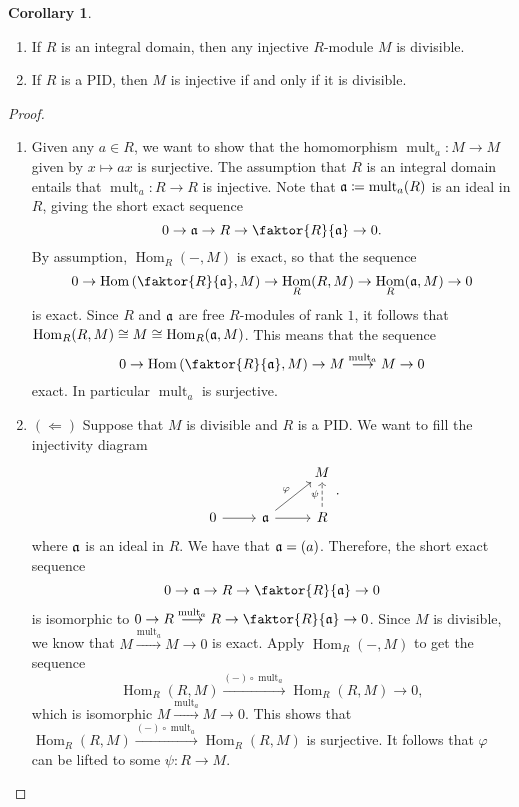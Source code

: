 \documentclass[10pt,letterpaper,cm]{nupset}
\theoremstyle{definition}
\theoremstyle{theorem}
\newtheorem{corollary}[definition]{Corollary}
\theoremstyle{remark}
\newcommand{\1}{\mathbf{1}}
\newcommand{\0}{\vec 0}
\DeclareMathOperator{\Hom}{Hom}
\DeclareMathOperator{\mult}{mult}
\begin{document}
\begin{corollary} $ $
\begin{enumerate}
\item If $R$ is an integral domain, then any injective $R$-module $M$ is divisible.
\item If $R$ is a PID, then $M$ is injective if and only if it is divisible.
\end{enumerate}
\end{corollary}
\begin{proof} $ $
\begin{enumerate}
\item Given any $a\in R$, we want to show that the homomorphism $\mult_a : M \to M$ given by $x\mapsto ax$ is surjective. The assumption that $R$ is an integral domain entails that $\mult_a : R\to R$ is injective. Note that $\frak{a}\coloneqq  \mult_a(R)$ is an ideal in $R$, giving the short exact sequence $$0 \to \frak{a} \to R \to \faktor{R}{\frak{a}}\to 0.  $$ By assumption, $\Hom_R(-, M)$ is exact, so that the sequence $$0 \to \Hom\left(\faktor{R}{\frak{a}}, M \right) \to \Hom_R(R, M) \to \Hom_R(\frak{a}, M) \to 0   $$ is exact. Since $R$ and $\frak{a}$ are free $R$-modules of rank $1$, it follows that $\Hom_R(R, M) \cong M \cong  \Hom_R(\frak{a}, M)$. This means that the sequence  $$0 \to \Hom\left(\faktor{R}{\frak{a}}, M \right) \to M \overset{\mult_a}{\longrightarrow} M \to 0 $$ exact. In particular $\mult_a$ is surjective.

\item $(\Longleftarrow)$ Suppose that $M$ is divisible and $R$ is a PID. We want to fill the injectivity diagram
\[
\begin{tikzcd}
 &  & M \\
0 \arrow[r] & \frak{a} \arrow[r] \arrow[ru, "\varphi"] & R \arrow[u, "\psi", dashed]
\end{tikzcd}.
\]
where $\frak{a}$ is an ideal in $R$. We have that $\frak{a} = (a)$. Therefore, the short exact sequence $$0 \to \frak{a} \to R \to \faktor{R}{\frak{a}} \to 0$$ is isomorphic to $0 \to R \overset{\mult_a}{\longrightarrow} R \to \faktor{R}{\frak{a}}\to 0$. Since $M$ is divisible, we know that $M \overset{\mult_a}{\longrightarrow} M \to 0$ is exact.  Apply $\Hom_R(-, M)$ to get the sequence $$\Hom_R(R, M) \overset{(-)\circ \mult_a}{\longrightarrow} \Hom_R(R, M) \to 0,$$ which is isomorphic $M \overset{\mult_a}{\longrightarrow} M \to 0$. This shows that $\Hom_R(R, M) \overset{(-)\circ \mult_a}{\longrightarrow} \Hom_R(R, M)$ is surjective. It follows that $\varphi$ can be lifted to some $\psi : R \to M$.
\end{enumerate}
\end{proof}
\end{document}
